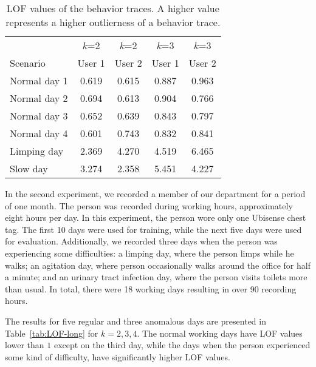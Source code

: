 \begin{table}[h!]
\centering
\caption{LOF values of the behavior traces. A higher value represents a higher outlierness of a behavior trace.}
\begin{tabular}{lcccc}
\toprule
 & $k$=2 & $k$=2 & $k$=3 & $k$=3 \\
Scenario & User 1 & User 2 & User 1 & User 2 \\
\hline
Normal day 1 & 0.619 & 0.615 & 0.887 & 0.963 \\
Normal day 2 & 0.694 & 0.613 & 0.904 & 0.766 \\
Normal day 3 & 0.652 & 0.639 & 0.843 & 0.797 \\
Normal day 4 & 0.601 & 0.743 & 0.832 & 0.841 \\
\hline
Limping day  & 2.369 & 4.270 & 4.519 & 6.465 \\
Slow day     & 3.274 & 2.358 & 5.451 & 4.227 \\
\toprule
\end{tabular}
\label{tab:LOF-values}
\end{table}

In the second experiment, we recorded a member of our department for a period of one month. The person was recorded during working hours, approximately eight hours per day. In this experiment, the person wore only one Ubisense chest tag. The first 10 days were used for training, while the next five days were used for evaluation. Additionally, we recorded three days when the person was experiencing some difficulties: a limping day, where the person limps while he walks; an agitation day, where person occasionally walks around the office for half a minute; and an urinary tract infection day, where the person visits toilets more than usual. In total, there were 18 working days resulting in over 90 recording hours.

The results for five regular and three anomalous days are presented in Table~\ref{tab:LOF-long} for $k={2,3,4}$. The normal working days have LOF values lower than $1$ except on the third day, while the days when the person experienced some kind of difficulty, have significantly higher LOF values.

